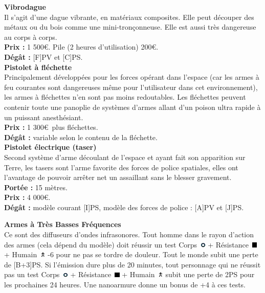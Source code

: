 \documentclass[11pt,twoside,a4paper]{article}
\def\imgCORPS{\includegraphics[width=0.25cm]{../../../../../imgGraphics/rolePlayingGame/SimulacreS/mini12x12/corps.png} }
\def\imgRESIS{\includegraphics[width=0.25cm]{../../../../../imgGraphics/rolePlayingGame/SimulacreS/mini12x12/resistance.png} }
\def\imgHUMAI{\includegraphics[width=0.25cm]{../../../../../imgGraphics/rolePlayingGame/SimulacreS/mini12x12/humain.png} }
\begin{document}
\begin{multicols*}{2}
\textbf{Vibrodague}~\\
Il s'agit d'une dague vibrante, en mat{\'e}riaux composites. Elle peut d{\'e}couper des m{\'e}taux ou du bois comme une mini-tron\c{c}onneuse. Elle est aussi tr{\`e}s dangereuse au corps {\`a} corps. ~\\
\textbf{Prix : }1 500\euro . Pile (2 heures d'utilisation) 200\euro . ~\\
\textbf{D{\'e}g{\^a}t : }[F]PV et [C]PS. ~\\

\textbf{Pistolet {\`a} fl{\'e}chette}~\\
Principalement d{\'e}velopp{\'e}es pour les forces op{\'e}rant dans l'espace (car les armes {\`a} feu courantes sont dangereuses m{\^e}me pour l'utilisateur dans cet environnement), les armes {\`a} fl{\'e}chettes n'en sont pas moins redoutables. Les fl{\'e}chettes peuvent contenir toute une panoplie de syst{\`e}mes d'armes allant d'un poison ultra rapide {\`a} un puissant anesth{\'e}siant. ~\\
\textbf{Prix : }1 300\euro ~plus fl{\'e}chettes. ~\\
\textbf{D{\'e}g{\^a}t : }variable selon le contenu de la fl{\'e}chette. ~\\

\textbf{Pistolet {\'e}lectrique (taser)}~\\
Second syst{\`e}me d'arme d{\'e}coulant de l'espace et ayant fait son apparition sur Terre, les tasers sont l'arme favorite des forces de police spatiales, elles ont l'avantage de pouvoir arr{\^e}ter net un assaillant sans le blesser gravement. ~\\
\textbf{Port{\'e}e : }15 m{\`e}tres. ~\\
\textbf{Prix : }4 000\euro . ~\\
\textbf{D{\'e}g{\^a}t : }mod{\`e}le courant [I]PS, mod{\`e}le des forces de police : [A]PV et [J]PS. %

\textbf{Armes {\`a} Tr{\`e}s Basses Fr{\'e}quences}~\\
Ce sont des diffuseurs d'ondes infrasonores. Tout homme dans le rayon d'action des armes (cela d{\'e}pend du mod{\`e}le) doit r{\'e}ussir un test Corps~\imgCORPS + R{\'e}sistance~\imgRESIS + Humain~\imgHUMAI -6 pour ne pas se tordre de douleur. Tout le monde subit une perte de [B+3]PS. Si l'{\'e}mission dure plus de 20 minutes, tout personnage qui ne r{\'e}ussit pas un test Corps~\imgCORPS + R{\'e}sistance~\imgRESIS + Humain~\imgHUMAI subit une perte de 2PS pour les prochaines 24 heures. Une nanoarmure donne un bonus de +4 {\`a} ces tests. %


\end{multicols*}
\end{document}
